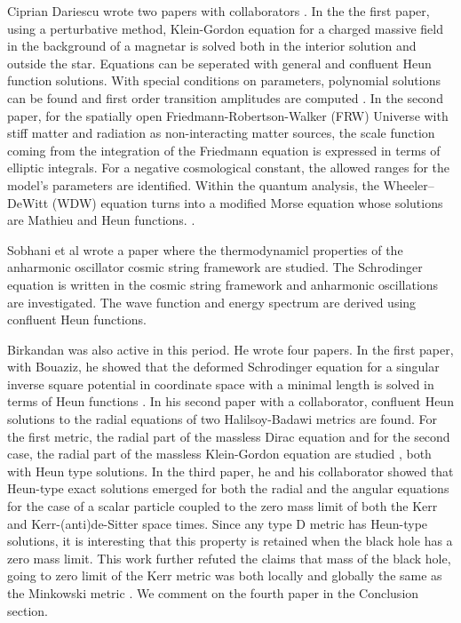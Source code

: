\documentclass{article}
\begin{document}
Ciprian Dariescu wrote two papers with collaborators \cite{Ciprian1, Ciprian2}. In the the first paper, using a perturbative method, Klein-Gordon equation for a charged massive field in the background of a magnetar is solved both in the interior solution and outside the star. Equations can be seperated with general and confluent Heun function solutions. With special conditions on parameters, polynomial solutions can be found and first order transition amplitudes are computed \cite
{Ciprian1}.
In the second paper, for the spatially open Friedmann-Robertson-Walker (FRW) Universe with stiff matter and radiation as non-interacting matter sources, the scale function coming from the integration of the Friedmann equation is expressed in terms of elliptic integrals. For a negative cosmological constant, the allowed ranges for the model’s parameters are identified. Within the quantum analysis, the Wheeler– DeWitt (WDW) equation turns into a modified Morse equation whose solutions are Mathieu and Heun functions. 
\cite{Ciprian2}. 

Sobhani et al \cite{Sobhani} wrote a paper where the thermodynamicl properties of the anharmonic oscillator cosmic string framework are studied. The Schrodinger equation is written in the cosmic string framework and anharmonic oscillations are investigated. The wave function and energy spectrum are derived using confluent Heun functions.
 
Birkandan was also active in this period. He wrote four papers. In the  first paper, with Bouaziz, he showed that the deformed Schrodinger equation for a singular inverse square potential in coordinate space with a minimal length is solved in terms of Heun functions \cite{Tolgab1}.
In his second paper with a collaborator, confluent Heun solutions to the radial equations of two Halilsoy-Badawi metrics are found. For the first metric, the radial part of the massless Dirac equation and for the second case,  the radial part of the massless Klein-Gordon equation  are studied \cite{Tolgab2}, both with Heun type solutions.
In the third paper, he and his collaborator showed that Heun-type exact solutions emerged for both the radial and the angular equations for the case of a scalar particle coupled to the zero mass limit of both the Kerr and Kerr-(anti)de-Sitter space times. Since any type D metric has Heun-type solutions, it is interesting that this property is retained  when the black hole has a zero mass limit. This work further refuted the claims that mass of the black hole, going to zero limit of the Kerr metric was both locally and globally the same as the Minkowski metric \cite{Tolgab3}.
We comment on the fourth paper in the Conclusion section. 
\end{document}
